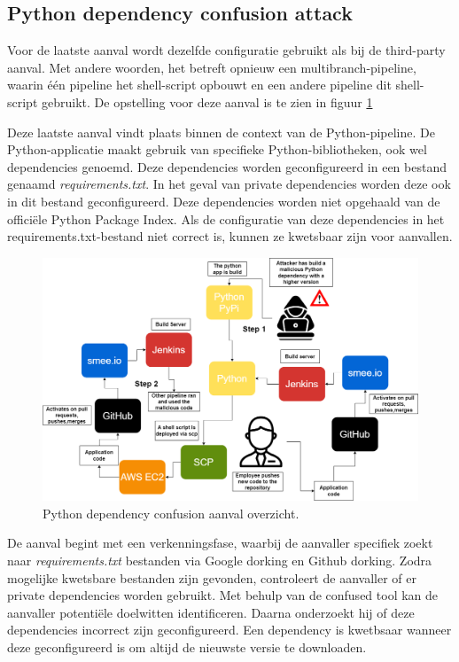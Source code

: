 \subsection{
{Python dependency confusion attack}}
\label{sec:Python dependency confusion aanval}

Voor de laatste aanval wordt dezelfde configuratie gebruikt als bij de third-party aanval. Met andere woorden, het betreft opnieuw een multibranch-pipeline, waarin één pipeline het shell-script opbouwt en een andere pipeline dit shell-script gebruikt. De opstelling voor deze aanval is te zien in figuur \ref{fig:pythonaanval}
\newline

Deze laatste aanval vindt plaats binnen de context van de Python-pipeline. De Python-applicatie maakt gebruik van specifieke Python-bibliotheken, ook wel dependencies genoemd. Deze dependencies worden geconfigureerd in een bestand genaamd \textit{requirements.txt}. In het geval van private dependencies worden deze ook in dit bestand geconfigureerd. Deze dependencies worden niet opgehaald van de officiële Python Package Index. Als de configuratie van deze dependencies in het requirements.txt-bestand niet correct is, kunnen ze kwetsbaar zijn voor aanvallen.
\newline

\begin{figure}[H]
  \includegraphics[scale=0.35]{graphics/attack4.png}
\caption{\label{fig:pythonaanval} Python dependency confusion aanval overzicht.}
\end{figure}

De aanval begint met een verkenningsfase, waarbij de aanvaller specifiek zoekt naar \textit{requirements.txt} bestanden via Google dorking en Github dorking. Zodra mogelijke kwetsbare bestanden zijn gevonden, controleert de aanvaller of er private dependencies worden gebruikt. Met behulp van de confused tool kan de aanvaller potentiële doelwitten identificeren. Daarna onderzoekt hij of deze dependencies incorrect zijn geconfigureerd. Een dependency is kwetbsaar wanneer deze geconfigureerd is om altijd de nieuwste versie te downloaden.
\newline

